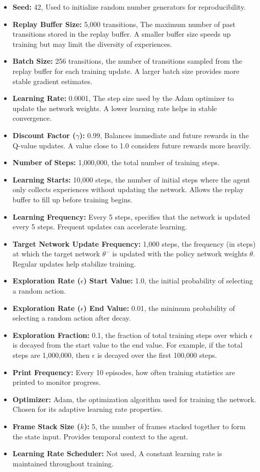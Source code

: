 \documentclass[
12pt, %
oneside, %
english, %
onehalfspacing, %
nolistspacing, %
liststotoc, %
headsepline, %
]{ProposalAndThesis} %
\begin{document}
\begin{itemize}
    \item \textbf{Seed:} 42, Used to initialize random number generators for reproducibility.
    \item \textbf{Replay Buffer Size:} 5,000 transitions, The maximum number of past transitions stored in the replay buffer. A smaller buffer size speeds up training but may limit the diversity of experiences.
    \item \textbf{Batch Size:} 256 transitions, the number of transitions sampled from the replay buffer for each training update. A larger batch size provides more stable gradient estimates.
    \item \textbf{Learning Rate:} 0.0001, The step size used by the Adam optimizer to update the network weights. A lower learning rate helps in stable convergence.
    \item \textbf{Discount Factor (\( \gamma \)):} 0.99, Balances immediate and future rewards in the Q-value updates. A value close to 1.0 considers future rewards more heavily.
    \item \textbf{Number of Steps:} 1,000,000, the total number of training steps.
    \item \textbf{Learning Starts:} 10,000 steps, the number of initial steps where the agent only collects experiences without updating the network. Allows the replay buffer to fill up before training begins.
    \item \textbf{Learning Frequency:} Every 5 steps, specifies that the network is updated every 5 steps. Frequent updates can accelerate learning.
    \item \textbf{Target Network Update Frequency:} 1,000 steps, the frequency (in steps) at which the target network \( \theta^- \) is updated with the policy network weights \( \theta \). Regular updates help stabilize training.
    \item \textbf{Exploration Rate (\( \epsilon \)) Start Value:} 1.0, the initial probability of selecting a random action.
    \item \textbf{Exploration Rate (\( \epsilon \)) End Value:} 0.01, the minimum probability of selecting a random action after decay.
    \item \textbf{Exploration Fraction:} 0.1, the fraction of total training steps over which \( \epsilon \) is decayed from the start value to the end value. For example, if the total steps are 1,000,000, then \( \epsilon \) is decayed over the first 100,000 steps.
    \item \textbf{Print Frequency:} Every 10 episodes, how often training statistics are printed to monitor progress.
    \item \textbf{Optimizer:} Adam, the optimization algorithm used for training the network. Chosen for its adaptive learning rate properties.
    \item \textbf{Frame Stack Size (\( k \)):} 5, the number of frames stacked together to form the state input. Provides temporal context to the agent.
    \item \textbf{Learning Rate Scheduler:} Not used, A constant learning rate is maintained throughout training.
\end{itemize}
\end{document}
